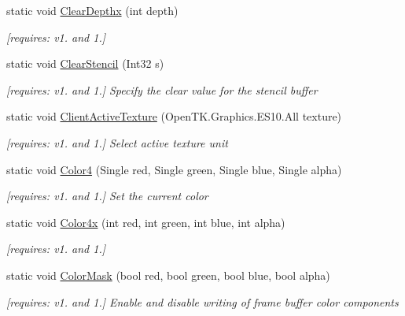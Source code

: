 \begin{DoxyCompactItemize}
static void \hyperlink{class_open_t_k_1_1_graphics_1_1_e_s10_1_1_g_l_a44cbad14f393e9d4e068f99aa408f10d}{Clear\-Depthx} (int depth)
\begin{DoxyCompactList}\small\item\em \mbox{[}requires\-: v1. and 1.\mbox{]}\end{DoxyCompactList}\item 
static void \hyperlink{class_open_t_k_1_1_graphics_1_1_e_s10_1_1_g_l_a1c66c99b6e3036405e44498cb5cece4e}{Clear\-Stencil} (Int32 s)
\begin{DoxyCompactList}\small\item\em \mbox{[}requires\-: v1. and 1.\mbox{]} Specify the clear value for the stencil buffer \end{DoxyCompactList}\item 
static void \hyperlink{class_open_t_k_1_1_graphics_1_1_e_s10_1_1_g_l_afdf93e53725eea497e8a3f6e8981fba0}{Client\-Active\-Texture} (Open\-T\-K.\-Graphics.\-E\-S10.\-All texture)
\begin{DoxyCompactList}\small\item\em \mbox{[}requires\-: v1. and 1.\mbox{]} Select active texture unit \end{DoxyCompactList}\item 
static void \hyperlink{class_open_t_k_1_1_graphics_1_1_e_s10_1_1_g_l_a8a177c349ee72aeef8d0817f3db14a9f}{Color4} (Single red, Single green, Single blue, Single alpha)
\begin{DoxyCompactList}\small\item\em \mbox{[}requires\-: v1. and 1.\mbox{]} Set the current color \end{DoxyCompactList}\item 
static void \hyperlink{class_open_t_k_1_1_graphics_1_1_e_s10_1_1_g_l_a826ddb9f3abd2b5c9110e6ead1de2d3b}{Color4x} (int red, int green, int blue, int alpha)
\begin{DoxyCompactList}\small\item\em \mbox{[}requires\-: v1. and 1.\mbox{]}\end{DoxyCompactList}\item 
static void \hyperlink{class_open_t_k_1_1_graphics_1_1_e_s10_1_1_g_l_a565579a0da6e5c2ebe22fc794f0b0776}{Color\-Mask} (bool red, bool green, bool blue, bool alpha)
\begin{DoxyCompactList}\small\item\em \mbox{[}requires\-: v1. and 1.\mbox{]} Enable and disable writing of frame buffer color components \end{DoxyCompactList}\item 

\end{DoxyCompactItemize}
